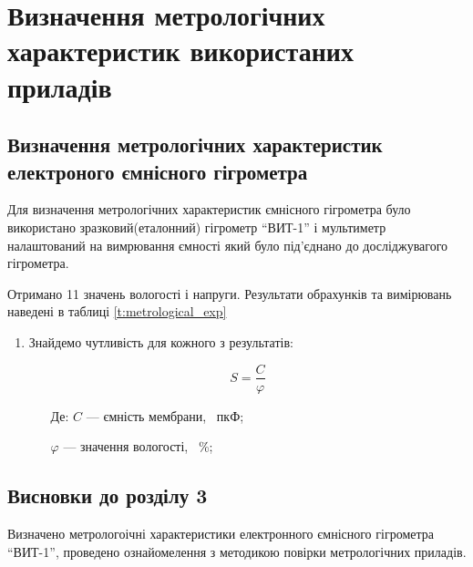 \chapter{Визначення метрологічних характеристик використаних приладів}
\section{Визначення метрологічних характеристик електроного ємнісного гігрометра}

Для визначення метрологічних характеристик ємнісного гігрометра було використано
зразковий(еталонний) гігрометр ``ВИТ-1'' і мультиметр налаштований на вимрювання ємності який було
під’єднано до досліджувагого гігрометра.

Отримано 11 значень вологості і напруги. Результати обрахунків та вимірювань наведені в таблиці \ref{t:metrological_exp}



\begin{enumerate}[leftmargin=*]
    \item Знайдемо чутливість для кожного з результатів:

    \begin{equation}
        S = \frac{C}{\varphi}
    \end{equation}

    \begin{itemize}
        \item [Де:] $C$ --- ємність мембрани, ~пкФ;
        \item []$\varphi$ ---  значення вологості, ~\%;
    \end{itemize}

    
\end{enumerate}

\section*{Висновки до розділу 3}

Визначено метрологоічні характеристики електронного ємнісного гігрометра ``ВИТ-1'', проведено
ознайомелення з методикою повірки метрологічних приладів.
